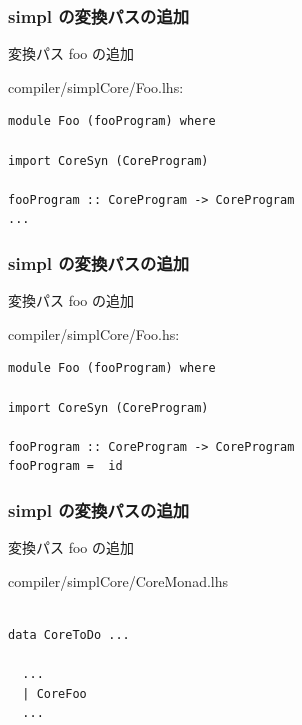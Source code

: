 \documentclass[cjk,dvipdfm,14pt]{beamer}
\begin{document}



\begin{frame}[fragile]
\frametitle{simpl の変換パスの追加}

変換パス foo の追加

\hrulefill

compiler/simplCore/Foo.lhs:

\begin{lstlisting}
module Foo (fooProgram) where

import CoreSyn (CoreProgram)

fooProgram :: CoreProgram -> CoreProgram
...
\end{lstlisting}

\end{frame}

\begin{frame}[fragile]
\frametitle{simpl の変換パスの追加}

変換パス foo の追加

\hrulefill

compiler/simplCore/Foo.hs:

\begin{lstlisting}
module Foo (fooProgram) where

import CoreSyn (CoreProgram)

fooProgram :: CoreProgram -> CoreProgram
fooProgram =  id
\end{lstlisting}

\end{frame}



\begin{frame}[fragile]
\frametitle{simpl の変換パスの追加}

変換パス foo の追加

\hrulefill

compiler/simplCore/CoreMonad.lhs

\begin{lstlisting}

data CoreToDo ...

  ...
  | CoreFoo
  ...
\end{lstlisting}

\end{frame}
\end{document}
